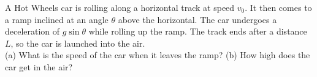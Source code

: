 A Hot Wheels car is rolling along a horizontal track at speed $v_0$.
It then comes to a ramp inclined at an angle $\theta$ above the horizontal.
The car undergoes a
deceleration of $g \sin \theta$ while rolling up the ramp. The track ends
after a distance $L$, so the car is launched into the air.\\
%
(a) What is the speed of the car when it leaves the ramp?\answercheck\hwendpart
%
(b) How high does the car get in the air?\answercheck
